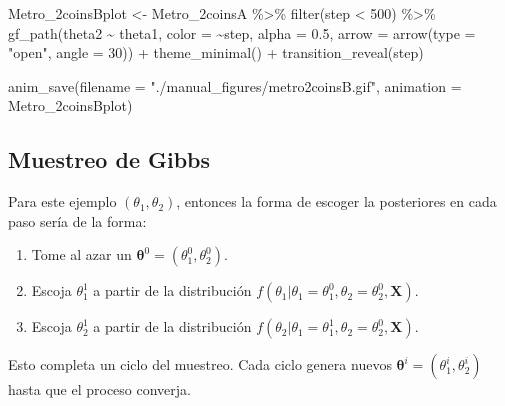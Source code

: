 \documentclass[
  12pt,
]{book}
\newenvironment{Shaded}{\begin{snugshade}}{\end{snugshade}}
\newcommand{\AttributeTok}[1]{\textcolor[rgb]{0.77,0.63,0.00}{#1}}
\newcommand{\DecValTok}[1]{\textcolor[rgb]{0.00,0.00,0.81}{#1}}
\newcommand{\FloatTok}[1]{\textcolor[rgb]{0.00,0.00,0.81}{#1}}
\newcommand{\FunctionTok}[1]{\textcolor[rgb]{0.00,0.00,0.00}{#1}}
\newcommand{\NormalTok}[1]{#1}
\newcommand{\OtherTok}[1]{\textcolor[rgb]{0.56,0.35,0.01}{#1}}
\newcommand{\SpecialCharTok}[1]{\textcolor[rgb]{0.00,0.00,0.00}{#1}}
\newcommand{\StringTok}[1]{\textcolor[rgb]{0.31,0.60,0.02}{#1}}
\providecommand{\tightlist}{%
  \setlength{\itemsep}{0pt}\setlength{\parskip}{0pt}}
\theoremstyle{definition}
\theoremstyle{definition}
\theoremstyle{definition}
\theoremstyle{definition}
\theoremstyle{remark}
\begin{document}
\begin{Shaded}
\begin{Highlighting}[]
\NormalTok{Metro\_2coinsBplot }\OtherTok{\textless{}{-}}\NormalTok{ Metro\_2coinsA }\SpecialCharTok{\%\textgreater{}\%}
    \FunctionTok{filter}\NormalTok{(step }\SpecialCharTok{\textless{}} \DecValTok{500}\NormalTok{) }\SpecialCharTok{\%\textgreater{}\%}
    \FunctionTok{gf\_path}\NormalTok{(theta2 }\SpecialCharTok{\textasciitilde{}}\NormalTok{ theta1, }\AttributeTok{color =} \SpecialCharTok{\textasciitilde{}}\NormalTok{step, }\AttributeTok{alpha =} \FloatTok{0.5}\NormalTok{,}
        \AttributeTok{arrow =} \FunctionTok{arrow}\NormalTok{(}\AttributeTok{type =} \StringTok{"open"}\NormalTok{, }\AttributeTok{angle =} \DecValTok{30}\NormalTok{)) }\SpecialCharTok{+}
    \FunctionTok{theme\_minimal}\NormalTok{() }\SpecialCharTok{+} \FunctionTok{transition\_reveal}\NormalTok{(step)}

\FunctionTok{anim\_save}\NormalTok{(}\AttributeTok{filename =} \StringTok{"./manual\_figures/metro2coinsB.gif"}\NormalTok{,}
    \AttributeTok{animation =}\NormalTok{ Metro\_2coinsBplot)}
\end{Highlighting}
\end{Shaded}

\hypertarget{muestreo-de-gibbs}{%
\subsection{Muestreo de Gibbs}\label{muestreo-de-gibbs}}

Para este ejemplo \(\left( \theta_{1},\theta_{2} \right)\), entonces la forma de escoger la posteriores en cada paso sería de la forma:

\begin{enumerate}
\def\labelenumi{\arabic{enumi}.}
\tightlist
\item
  Tome al azar un \(\boldsymbol{\theta}^{0} = \left( \theta_{1}^{0},\theta_{2}^{0} \right)\).
\item
  Escoja \(\theta_{1}^{1}\) a partir de la distribución
  \(f\left(\theta_{1} \vert \theta_{1}=\theta_{1}^{0}, \theta_{2}=\theta_{2}^{0}, \boldsymbol{X} \right)\).
\item
  Escoja \(\theta_{2}^{1}\) a partir de la distribución
  \(f\left(\theta_{2} \vert \theta_{1}=\theta_{1}^{1}, \theta_{2}=\theta_{2}^{0}, \boldsymbol{X} \right)\).
\end{enumerate}

Esto completa un ciclo del muestreo. Cada ciclo genera nuevos \(\boldsymbol{\theta}^{i} = \left( \theta_{1}^{i},\theta_{2}^{i} \right)\) hasta que el proceso converja.
\end{document}
